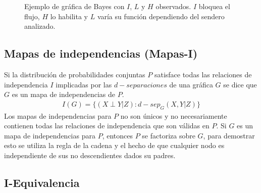 \begin{figure}
\begin{center}
\end{center}
\caption{Ejemplo de gráfica de Bayes con $I$, $L$ y $H$ observados. $I$ bloquea el flujo, $H$ lo habilita y $L$ varía su función dependiendo del sendero analizado.}\label{fig:senderosActivos1}
\end{figure}




\subsection{Mapas de independencias (Mapas-I)}

Si la distribución de probabilidades conjuntas $P$ satisface todas las relaciones de independencia $I$ implicadas por las $d-separaciones$ de una gráfica $G$ se dice que $G$ es un mapa de independencias de $P$.
\begin{align}
 I(G) = \{(X \perp Y | Z) : d-sep_G(X,Y|Z)\}
\end{align}
Los mapas de independencias para $P$ no son únicos y no necesariamente contienen todas las relaciones de independencia que son válidas en $P$.
Si $G$ es un mapa de independencias para $P$, entonces $P$ se factoriza sobre $G$, para demostrar esto se utiliza la regla de la cadena y el hecho de que cualquier nodo es independiente de sus no descendientes dados su padres.


\subsection{I-Equivalencia}

